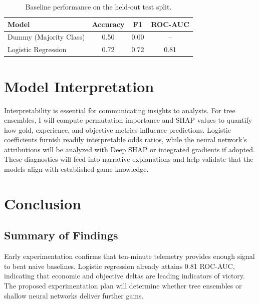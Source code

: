 \documentclass[aps,prl,preprint,groupedaddress]{revtex4-2}
\begin{document}
\begin{table}[H]
\centering
\caption{Baseline performance on the held-out test split.}
\label{tab:baseline_performance}
\begin{tabular}{@{}lccc@{}}
\toprule
\textbf{Model} & \textbf{Accuracy} & \textbf{F1} & \textbf{ROC-AUC} \\ \midrule
Dummy (Majority Class) & 0.50 & 0.00 & -- \\
Logistic Regression & 0.72 & 0.72 & 0.81 \\
\bottomrule
\end{tabular}
\end{table}

\section{Model Interpretation}
\label{sec:interpretation}

Interpretability is essential for communicating insights to analysts. For tree ensembles, I will compute permutation importance and SHAP values \cite{lundberg2017shap} to quantify how gold, experience, and objective metrics influence predictions. Logistic coefficients furnish readily interpretable odds ratios, while the neural network's attributions will be analyzed with Deep SHAP or integrated gradients if adopted. These diagnostics will feed into narrative explanations and help validate that the models align with established game knowledge.

\section{Conclusion}
\label{sec:conclusion}

\subsection{Summary of Findings}
Early experimentation confirms that ten-minute telemetry provides enough signal to beat naive baselines. Logistic regression already attains 0.81 ROC-AUC, indicating that economic and objective deltas are leading indicators of victory. The proposed experimentation plan will determine whether tree ensembles or shallow neural networks deliver further gains.
\end{document}
